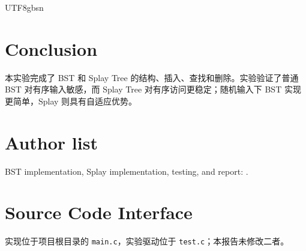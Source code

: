 \documentclass{article}
\begin{document}
\begin{CJK*}{UTF8}{gbsn}
\section{Conclusion}
本实验完成了 BST 和 Splay Tree 的结构、插入、查找和删除。实验验证了普通 BST 对有序输入敏感，而 Splay Tree 对有序访问更稳定；随机输入下 BST 实现更简单，Splay 则具有自适应优势。
\section{Author list}BST implementation, Splay implementation, testing, and report: \underline{\hspace{5cm}}.
\appendix\section{Source Code Interface}实现位于项目根目录的 \texttt{main.c}，实验驱动位于 \texttt{test.c}；本报告未修改二者。
\end{CJK*}
\end{document}

